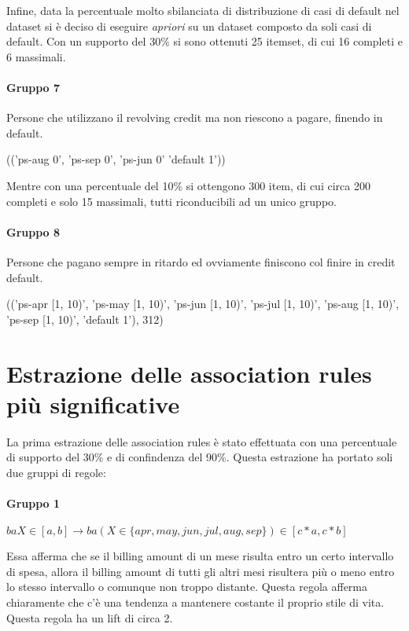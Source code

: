 Infine, data la percentuale molto sbilanciata di distribuzione di casi di default
nel dataset si \`e deciso di eseguire \textit{apriori} su un dataset composto
da soli casi di default. Con un supporto del 30\% si sono ottenuti 25 itemset,
di cui 16 completi e 6 massimali.


\paragraph{Gruppo 7}
Persone che utilizzano il revolving credit ma non riescono a pagare, finendo
in default.

\begin{center}
	(('ps-aug 0', 'ps-sep 0', 'ps-jun 0' 'default 1'))
\end{center}

Mentre con una percentuale del 10\% si ottengono 300 item, di cui circa 200 completi
e solo 15 massimali, tutti riconducibili ad un unico gruppo.

\paragraph{Gruppo 8}
Persone che pagano sempre in ritardo ed ovviamente finiscono col finire in credit
default.

\begin{center}
	(('ps-apr [1, 10)', 'ps-may [1, 10)', 'ps-jun [1, 10)', 'ps-jul [1, 10)', 'ps-aug [1, 10)', 'ps-sep [1, 10)', 'default 1'), 312)
\end{center}

\section{Estrazione delle association rules pi\`u significative}
La prima estrazione delle association rules \`e stato effettuata con una percentuale
di supporto del 30\% e di confindenza del 90\%. Questa estrazione ha portato
soli due gruppi di regole:

\paragraph{Gruppo 1}
\begin{center}
	$baX \in [a,b] \rightarrow ba(X \in \{apr,may,jun,jul,aug,sep\}) \in [c*a, c*b]$
\end{center}

Essa afferma che se il billing amount di un mese risulta entro un certo intervallo
di spesa, allora il billing amount di tutti gli altri mesi risultera pi\`u o 
meno entro lo stesso intervallo o comunque non troppo distante. Questa regola
afferma chiaramente che c'\`e una tendenza a mantenere costante il proprio stile
di vita. Questa regola ha un lift di circa 2.

